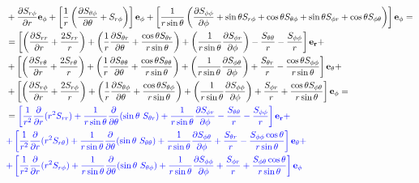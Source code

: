 \documentclass[11pt]{article}
\newcommand{\dr}{\frac{\partial}{\partial r}}
\begin{document}
\begin{align}
& + \frac{\partial S_{r\phi}}{\partial r} {\bf{e_\phi}} + \left[\frac{1}{r} \left(\frac{\partial S_{\theta \phi}}{\partial \theta} + S_{r\phi} \right)  \right]{\bf{e_\phi}} + \left[\frac{1}{r\sin{\theta}} \left(\frac{\partial S_{\phi \phi}}{\partial \phi} + \sin{\theta}S_{r\phi} + \cos{\theta}S_{\theta \phi} + \sin{\theta} S_{\phi r} + \cos{\theta}S_{\phi \theta} \right) \right]{\bf{e_\phi}} = \\
& = \left[\left(\frac{\partial S_{rr}}{\partial r} + \frac{2 S_{rr}}{r} \right) + \left(\frac{1}{r} \frac{\partial S_{\theta r}}{\partial \theta} + \frac{\cos{\theta} S_{\theta r}}{r \sin{\theta}} \right) + \left( \frac{1}{r\sin{\theta}} \frac{\partial S_{\phi r}}{\partial \phi} \right) - \frac{S_{\theta \theta}}{r} - \frac{S_{\phi \phi}}{r} \right]{\bf{e_r}} + \\
& + \left[ \left(\frac{\partial S_{r\theta}}{\partial r} + \frac{2 S_{r\theta}}{r} \right) + \left(\frac{1}{r}\frac{\partial S_{\theta \theta}}{\partial \theta} + \frac{\cos{\theta} S_{\theta \theta}}{r\sin{\theta}} \right) + \left(\frac{1}{r\sin{\theta}}\frac{\partial S_{\phi \theta}}{\partial \phi} \right) + \frac{S_{\theta r}}{r} - \frac{\cos{\theta} S_{\phi \phi}}{r\sin{\theta}} \right]{\bf{e_\theta}} + \\
& + \left[\left(\frac{\partial S_{r\phi}}{\partial r} + \frac{2 S_{r\phi}}{r} \right) + \left(\frac{1}{r} \frac{\partial S_{\theta \phi}}{\partial \theta} + \frac{\cos{\theta}S_{\theta \phi}}{r\sin{\theta}} \right) + \left( \frac{1}{r\sin{\theta}}\frac{\partial S_{\phi \phi}}{\partial \phi} \right) + \frac{S_{\phi r}}{r} + \frac{\cos{\theta}S_{\phi \theta}}{r\sin{\theta}} \right]{\bf{e_\phi}} = \\
& = {\color{blue} \left[ \frac{1}{r^2}\dr (r^2 S_{rr}) + \frac{1}{r\sin{\theta}}\frac{\partial}{\partial \theta} (\sin{\theta} \ S_{\theta r}) + \frac{1}{r\sin{\theta}}\frac{\partial S_{\phi r}}{\partial \phi} - \frac{S_{\theta\theta}}{r} - \frac{S_{\phi\phi}}{r} \right]{\bf{e_r}} + } \\
& {\color{blue} + \left[ \frac{1}{r^2}\dr (r^2 S_{r \theta}) + \frac{1}{r\sin{\theta}}\frac{\partial}{\partial \theta} (\sin{\theta} \ S_{\theta\theta}) + \frac{1}{r\sin{\theta}}\frac{\partial S_{\phi \theta}}{\partial \phi}  + \frac{S_{\theta r}}{r} - \frac{S_{\phi\phi} \cos{\theta}}{r\sin{\theta}} \right]{\bf{e_\theta}} + }\\
& {\color{blue} + \left[ \frac{1}{r^2}\dr (r^2 S_{r \phi}) + \frac{1}{r\sin{\theta}}\frac{\partial}{\partial \theta} (\sin{\theta} \ S_{\theta \phi}) + \frac{1}{r\sin{\theta}}\frac{\partial  S_{\phi\phi}}{\partial \phi} + \frac{S_{\phi r}}{r} + \frac{S_{\phi \theta} \cos{\theta}}{r\sin{\theta}} \right]{\bf{e_\phi}} }
\end{align}
\end{document}
